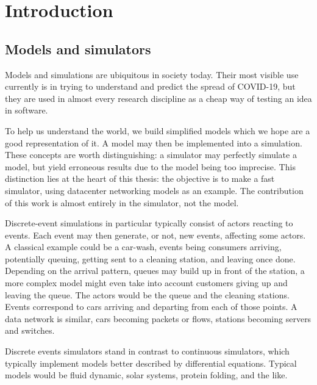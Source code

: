\chapter{Introduction} \label{intro}

\section{Models and simulators}

Models and simulations are ubiquitous in society today.
Their most visible use currently is in trying to understand and predict the spread of COVID-19, but they are used in almost every research discipline as a cheap way of testing an idea in software.

To help us understand the world, we build simplified models which we hope are a good representation of it.
A model may then be implemented into a simulation.
These concepts are worth distinguishing: a simulator may perfectly simulate a model, but yield erroneous results due to the model being too imprecise.
This distinction lies at the heart of this thesis: the objective is to make a fast simulator, using datacenter networking models as an example.
The contribution of this work is almost entirely in the simulator, not the model.

Discrete-event simulations in particular typically consist of actors reacting to events.
Each event may then generate, or not, new events, affecting some actors.
A classical example could be a car-wash, events being consumers arriving, potentially queuing, getting sent to a cleaning station, and leaving once done.
Depending on the arrival pattern, queues may build up in front of the station, a more complex model might even take into account customers giving up and leaving the queue. %
The actors would be the queue and the cleaning stations. Events correspond to cars arriving and departing from each of those points.
A data network is similar, cars becoming packets or flows, stations becoming servers and switches.

Discrete events simulators stand in contrast to continuous simulators, which typically implement models better described by differential equations.
Typical models would be fluid dynamic, solar systems, protein folding, and the like. %